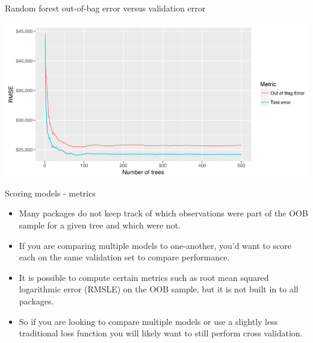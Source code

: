 \documentclass[10pt,ignorenonframetext,]{beamer}
\providecommand{\tightlist}{%
  \setlength{\itemsep}{0pt}\setlength{\parskip}{0pt}}
\begin{document}
\begin{frame}{Random forest out-of-bag error versus validation error}

\includegraphics{figure/random_trees_fig1.PNG}

\end{frame}

\begin{frame}{Scoring models - metrics}

\begin{itemize}
\tightlist
\item
  Many packages do not keep track of which observations were part of the
  OOB sample for a given tree and which were not.
\item
  If you are comparing multiple models to one-another, you'd want to
  score each on the same validation set to compare performance.
\item
  It is possible to compute certain metrics such as root mean squared
  logarithmic error (RMSLE) on the OOB sample, but it is not built in to
  all packages.
\item
  So if you are looking to compare multiple models or use a slightly
  less traditional loss function you will likely want to still perform
  cross validation.
\end{itemize}

\end{frame}
\end{document}

